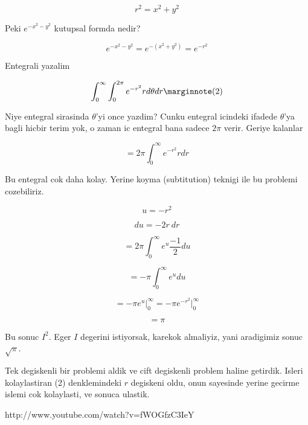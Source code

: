 \documentclass[12pt,fleqn]{article}\usepackage{../common}
\begin{document}
\[ r^2 = x^2 + y^2 \]

Peki $e^{-x^2-y^2}$ kutupsal formda nedir? 

\[ e^{-x^2-y^2} = e^{-(x^2+y^2)} = e^{-r^2} \]

Entegrali yazalim

\[ \int_{0}^{\infty} \int_{0}^{2\pi} e^{-r^2} r d\theta dr 
\mlabel{2}
\]

Niye entegral sirasinda $\theta$'yi once yazdim? Cunku entegral icindeki
ifadede $\theta$'ya bagli hicbir terim yok, o zaman ic entegral bana sadece
$2\pi$ verir. Geriye kalanlar

\[=  2\pi \int_{0}^{\infty} e^{-r^2} r dr \]

Bu entegral cok daha kolay. Yerine koyma (subtitution) teknigi ile bu
problemi cozebiliriz. 

\[ u = -r^2 \]

\[ du =  -2r \ dr\]

\[=  2\pi \int_{0}^{\infty} e^u \frac{-1}{2} du \]

\[=  -\pi \int_{0}^{\infty} e^u  du \]

\[=  -\pi  e^u  \bigg|_{0}^{\infty} = -\pi  e^{-r^2}  \bigg|_{0}^{\infty} \]

\[ = \pi \]

Bu sonuc $I^2$. Eger $I$ degerini istiyorsak, karekok almaliyiz, yani
aradigimiz sonuc $\sqrt{\pi}$. 

Tek degiskenli bir problemi aldik ve cift degiskenli problem haline
getirdik. Isleri kolaylastiran (2) denklemindeki $r$ degiskeni oldu, onun
sayesinde yerine gecirme islemi cok kolaylasti, ve sonuca ulastik. 



http://www.youtube.com/watch?v=fWOGfzC3IeY
\end{document}
